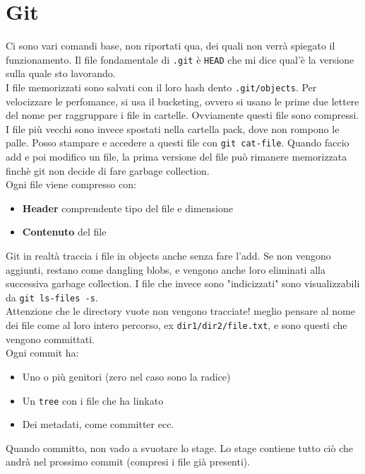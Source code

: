 \documentclass[a4paper,12pt]{article}
\begin{document}
\section{Git}
Ci sono vari comandi base, non riportati qua, dei quali non verrà spiegato il funzionamento.
Il file fondamentale di \texttt{.git} è \texttt{HEAD} che mi dice qual'è la versione sulla quale sto lavorando.\\
I file memorizzati sono salvati con il loro hash dento \texttt{.git/objects}. Per velocizzare le perfomance, si usa il bucketing, ovvero si usano le prime due lettere del nome per raggruppare i file in cartelle. Ovviamente questi file sono compressi. I file più vecchi sono invece spostati nella cartella pack, dove non rompono le palle. Posso stampare e accedere a questi file con \texttt{git cat-file}.
Quando faccio add e poi modifico un file, la prima versione del file può rimanere memorizzata finchè git non decide di fare garbage collection.\\
Ogni file viene compresso con:
\begin{itemize}
\item \textbf{Header} comprendente tipo del file e dimensione
\item \textbf{Contenuto} del file
\end{itemize}
Git in realtà traccia i file in objects anche senza fare l'add. Se non vengono aggiunti, restano come dangling blobs, e vengono anche loro eliminati alla successiva garbage collection. I file che invece sono "indicizzati" sono visualizzabili da \texttt{git ls-files -s}.\\
Attenzione che le directory vuote non vengono tracciate! \E meglio pensare al nome dei file come al loro intero percorso, ex \texttt{dir1/dir2/file.txt}, e sono questi che vengono committati.\\
Ogni commit ha:
\begin{itemize}
\item Uno o più genitori (zero nel caso sono la radice)
\item Un \texttt{tree} con i file che ha linkato
\item Dei metadati, come committer ecc.
\end{itemize}
Quando committo, non vado a svuotare lo stage. Lo stage contiene tutto ciò che andrà nel prossimo commit (compresi i file già presenti).
\end{document}
